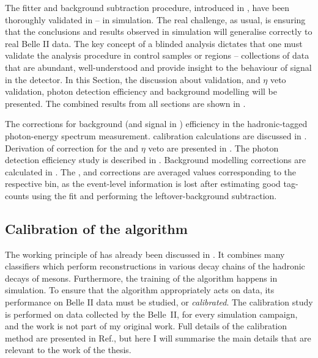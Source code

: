 The fitter and background subtraction procedure, introduced in ,
have been thoroughly validated in  -- in simulation.
The real challenge, as usual, is ensuring that the conclusions and results observed in simulation will generalise correctly to real Belle II data.
The key concept of a blinded analysis dictates that one must validate the analysis procedure in control samples or regions -- collections of data that are abundant, well-understood and provide insight to the behaviour of signal in the detector.
In this Section, the discussion about \FEI validation, 
\piz and $\eta$ veto validation, photon detection efficiency and background modelling will be presented.
The combined results from all sections are shown in .

\begin{table}[htbp!]
    \centering
    \caption{\label{tab:correction_table} The corrections for background (and signal in ) efficiency in the hadronic-tagged \BtoXsgamma photon-energy spectrum measurement.
    \FEI calibration calculations are discussed in .
    Derivation of correction for the \piz and $\eta$ veto are presented in .
    The photon detection efficiency study is described in .
    Background modelling corrections are calculated in .
    The \FEI, \piz and \g corrections are averaged values corresponding to the respective \EB bin,
    as the event-level information is lost after estimating good tag-\B counts using the \Mbc fit and performing the leftover-\BB background subtraction.
    }
    
\end{table}


\subsection{Calibration of the \texorpdfstring{\FEI}{FEI} algorithm}\label{sec:fei_calibration}

The working principle of \FEI has already been discussed in .
It combines many classifiers which perform reconstructions in various decay chains of the hadronic decays of \B mesons.
Furthermore, the training of the algorithm happens in simulation.
To ensure that the algorithm appropriately acts on data, its performance on Belle II data must be studied, or \textit{calibrated}.
The calibration study is performed on data collected by the Belle~II, for every simulation campaign, and the work is not part of my original work.
Full details of the calibration method are presented in Ref.\cite{Belle-II:2020fst}, but here I will summarise the main details that are relevant to the work of the thesis.

